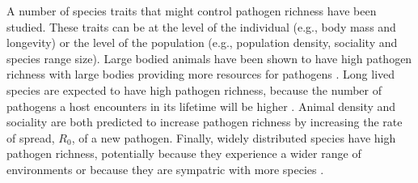 

A number of species traits that might control pathogen richness have been studied.
These traits can be at the level of the individual (e.g., body mass and longevity) or the level of the population (e.g., population density, sociality and species range size).
Large bodied animals have been shown to have high pathogen richness with large bodies providing more resources for pathogens \cite{kamiya2014determines, arneberg2002host, poulin1995phylogeny, bordes2008bat, luis2013comparison}.
Long lived species are expected to have high pathogen richness, because the number of pathogens a host encounters in its lifetime will be higher \cite{nunn2003comparative, ezenwa2006host, luis2013comparison}.
Animal density \cite{kamiya2014determines, nunn2003comparative, arneberg2002host} and sociality \cite{bordes2007rodent, vitone2004body, altizer2003social, ezenwa2006host} are both predicted to increase pathogen richness by increasing the rate of spread, $R_0$, of a new pathogen.
Finally, widely distributed species have high pathogen richness, potentially because they experience a wider range of environments or because they are sympatric with more species \cite{kamiya2014determines, nunn2003comparative, luis2013comparison}.




